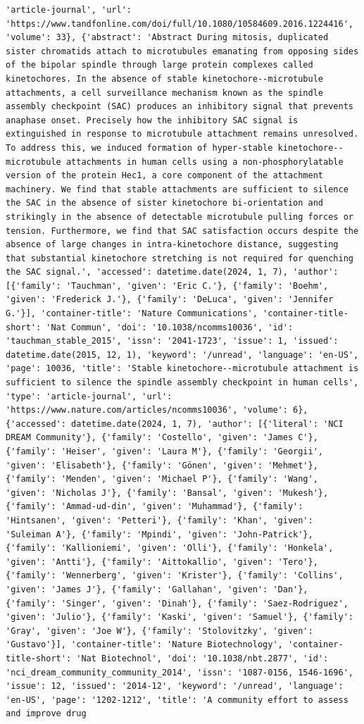 \documentclass[
  12pt,
]
{article}
\begin{document}
\begin{verbatim}
'article-journal', 'url': 'https://www.tandfonline.com/doi/full/10.1080/10584609.2016.1224416', 'volume': 33}, {'abstract': 'Abstract During mitosis, duplicated sister chromatids attach to microtubules emanating from opposing sides of the bipolar spindle through large protein complexes called kinetochores. In the absence of stable kinetochore--microtubule attachments, a cell surveillance mechanism known as the spindle assembly checkpoint (SAC) produces an inhibitory signal that prevents anaphase onset. Precisely how the inhibitory SAC signal is extinguished in response to microtubule attachment remains unresolved. To address this, we induced formation of hyper-stable kinetochore--microtubule attachments in human cells using a non-phosphorylatable version of the protein Hec1, a core component of the attachment machinery. We find that stable attachments are sufficient to silence the SAC in the absence of sister kinetochore bi-orientation and strikingly in the absence of detectable microtubule pulling forces or tension. Furthermore, we find that SAC satisfaction occurs despite the absence of large changes in intra-kinetochore distance, suggesting that substantial kinetochore stretching is not required for quenching the SAC signal.', 'accessed': datetime.date(2024, 1, 7), 'author': [{'family': 'Tauchman', 'given': 'Eric C.'}, {'family': 'Boehm', 'given': 'Frederick J.'}, {'family': 'DeLuca', 'given': 'Jennifer G.'}], 'container-title': 'Nature Communications', 'container-title-short': 'Nat Commun', 'doi': '10.1038/ncomms10036', 'id': 'tauchman_stable_2015', 'issn': '2041-1723', 'issue': 1, 'issued': datetime.date(2015, 12, 1), 'keyword': '/unread', 'language': 'en-US', 'page': 10036, 'title': 'Stable kinetochore--microtubule attachment is sufficient to silence the spindle assembly checkpoint in human cells', 'type': 'article-journal', 'url': 'https://www.nature.com/articles/ncomms10036', 'volume': 6}, {'accessed': datetime.date(2024, 1, 7), 'author': [{'literal': 'NCI DREAM Community'}, {'family': 'Costello', 'given': 'James C'}, {'family': 'Heiser', 'given': 'Laura M'}, {'family': 'Georgii', 'given': 'Elisabeth'}, {'family': 'Gönen', 'given': 'Mehmet'}, {'family': 'Menden', 'given': 'Michael P'}, {'family': 'Wang', 'given': 'Nicholas J'}, {'family': 'Bansal', 'given': 'Mukesh'}, {'family': 'Ammad-ud-din', 'given': 'Muhammad'}, {'family': 'Hintsanen', 'given': 'Petteri'}, {'family': 'Khan', 'given': 'Suleiman A'}, {'family': 'Mpindi', 'given': 'John-Patrick'}, {'family': 'Kallioniemi', 'given': 'Olli'}, {'family': 'Honkela', 'given': 'Antti'}, {'family': 'Aittokallio', 'given': 'Tero'}, {'family': 'Wennerberg', 'given': 'Krister'}, {'family': 'Collins', 'given': 'James J'}, {'family': 'Gallahan', 'given': 'Dan'}, {'family': 'Singer', 'given': 'Dinah'}, {'family': 'Saez-Rodriguez', 'given': 'Julio'}, {'family': 'Kaski', 'given': 'Samuel'}, {'family': 'Gray', 'given': 'Joe W'}, {'family': 'Stolovitzky', 'given': 'Gustavo'}], 'container-title': 'Nature Biotechnology', 'container-title-short': 'Nat Biotechnol', 'doi': '10.1038/nbt.2877', 'id': 'nci_dream_community_community_2014', 'issn': '1087-0156, 1546-1696', 'issue': 12, 'issued': '2014-12', 'keyword': '/unread', 'language': 'en-US', 'page': '1202-1212', 'title': 'A community effort to assess and improve drug 
\end{verbatim}
\end{document}
